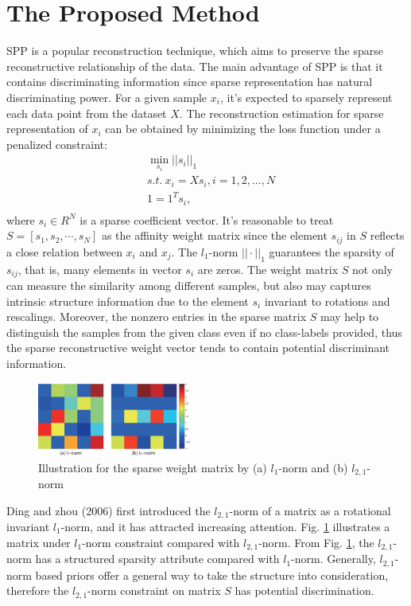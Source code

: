 \documentclass{sig-alternate}
\begin{document}
\section{The Proposed Method}
SPP is a popular reconstruction technique, which aims to preserve the sparse reconstructive relationship of the data. The main advantage of SPP is that it contains discriminating information since sparse representation has natural discriminating power. For a given sample $x_i$, it's expected to sparsely represent each data point from the dataset $X$. The reconstruction estimation for sparse representation of $x_i$ can be obtained by minimizing the loss function under a penalized constraint:
\begin{equation}\label{eqpa1}
    \begin{split}
&\min_{s_i}||s_i||_1\\
&s.t. \ x_i=Xs_i, i=1,2,...,N\\
&1=1^Ts_i,\\
    \end{split}
\end{equation}
where $s_i \in R^N$ is a sparse coefficient vector. It's reasonable to treat $S=[s_1, s_2,\cdots,s_N]$ as the affinity weight matrix since the element $s_{ij}$ in $S$ reflects a close relation between $x_i$ and $x_j$. The $l_1$-norm $||\cdot||_1$ guarantees the sparsity of $s_{ij}$, that is, many elements in vector $s_i$ are zeros. The weight matrix $S$ not only can measure the similarity among different samples, but also may captures intrinsic structure information due to the element $s_i$ invariant to rotations and rescalings. Moreover, the nonzero entries in the sparse matrix $S$ may help to distinguish the samples from the given class even if no class-labels provided, thus the sparse reconstructive weight vector tends to contain potential discriminant information.
\begin{figure}
\centering
\includegraphics[width=0.45\textwidth]{images/norm.eps}
\caption{Illustration for the sparse weight matrix by (a) $l_1$-norm and (b) $l_{2,1}$-norm}\label{fignorm1}
\end{figure}
Ding and zhou (2006) first introduced the $l_{2,1}$-norm of a matrix as a rotational invariant $l_{1}$-norm, and it has attracted increasing attention. Fig. \ref{fignorm1} illustrates a matrix under $l_{1}$-norm constraint compared with $l_{2,1}$-norm. From Fig. \ref{fignorm1}, the $l_{2,1}$-norm has a structured sparsity attribute compared with $l_1$-norm. Generally, $l_{2,1}$-norm based priors offer a general way to take the structure into consideration, therefore the $l_{2,1}$-norm constraint on matrix $S$ has potential discrimination.
\end{document}
